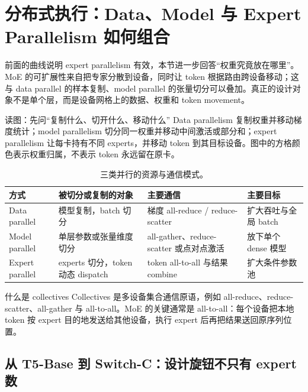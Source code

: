 \section{分布式执行：Data、Model 与 Expert Parallelism 如何组合}

前面的曲线说明 expert parallelism 有效，本节进一步回答“权重究竟放在哪里”。MoE 的可扩展性来自把专家分散到设备，同时让 token 根据路由跨设备移动；这与 data parallel 的样本复制、model parallel 的张量切分可以叠加。真正的设计对象不是单个层，而是设备网格上的数据、权重和 token movement。


\begin{knowledgebox}{读图：先问“复制什么、切开什么、移动什么”}
Data parallelism 复制权重并移动梯度统计；model parallelism 切分同一权重并移动中间激活或部分和；expert parallelism 让每卡持有不同 experts，并移动 token 到其目标设备。图中的方格颜色表示权重归属，不表示 token 永远留在原卡。
\end{knowledgebox}

\begin{table}[H]
\centering
\small
\caption{三类并行的资源与通信模式。}
\begin{tabularx}{\textwidth}{L{0.19\textwidth}L{0.23\textwidth}X X}
\toprule
方式 & 被切分或复制的对象 & 主要通信 & 主要目标 \\
\midrule
Data parallel & 模型复制，batch 切分 & 梯度 all-reduce / reduce-scatter & 扩大吞吐与全局 batch \\
Model parallel & 单层参数或张量维度切分 & all-gather、reduce-scatter 或点对点激活 & 放下单个 dense 模型 \\
Expert parallel & experts 切分，token 动态 dispatch & token all-to-all 与结果 combine & 扩大条件参数池 \\
\bottomrule
\end{tabularx}
\end{table}

\begin{importantbox}{什么是 collectives}
Collectives 是多设备集合通信原语，例如 all-reduce、reduce-scatter、all-gather 与 all-to-all。MoE 的关键通常是 all-to-all：每个设备把本地 token 按 expert 目的地发送给其他设备，执行 expert 后再把结果送回原序列位置。
\end{importantbox}

\subsection{从 T5-Base 到 Switch-C：设计旋钮不只有 expert 数}

